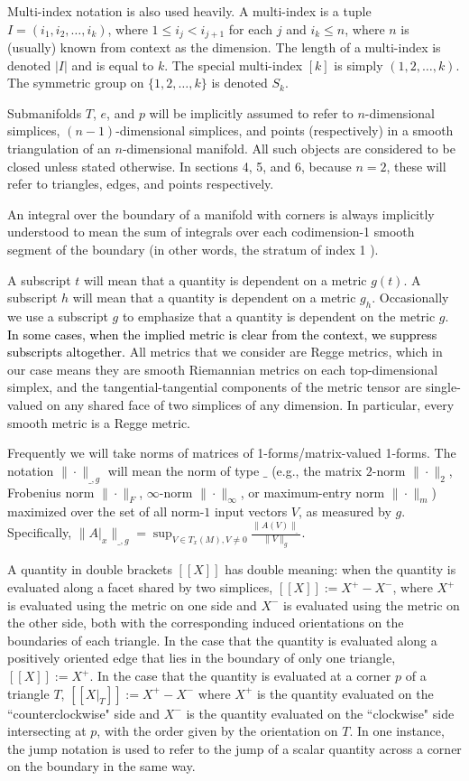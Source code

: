 \documentclass[11pt]{article}
\newcommand{\correction}[2]{\textcolor{red}{}\textcolor{black}{#2}}
\begin{document}
Multi-index notation is also used heavily. A multi-index is a tuple $I = (i_1,i_2,\dots,i_k)$, where $1 \le i_j < i_{j+1}$ for each $j$ and $i_k \le n$, where $n$ is (usually) known from context as the dimension. The length of a multi-index is denoted $|I|$ and is equal to $k$. The special multi-index $[k]$ is simply $(1,2,\dots,k)$.  The symmetric group on $\{1,2,\dots,k\}$ is denoted $S_k$.

Submanifolds $T$, $e$, and $p$ will be implicitly assumed to refer to $n$-dimensional simplices, $(n-1)$-dimensional simplices, and points (respectively) in a smooth triangulation of an $n$-dimensional manifold. All such objects are considered to be closed unless stated otherwise. In sections 4, 5, and 6, because $n=2$, these will refer to triangles, edges, and points respectively.

An integral over the boundary of a manifold with corners is always implicitly understood to mean the sum of integrals over each codimension-1 smooth segment of the boundary (in other words, the stratum of index 1 \cite{Knapp}).

A subscript $t$ will mean that a quantity is dependent on a metric $g(t)$. A subscript $h$ will mean that a quantity is dependent on a metric $g_h$. Occasionally we use a subscript $g$ to emphasize that a quantity is dependent on the metric $g$. \correction{}{In some cases, when the implied metric is clear from the context, we suppress subscripts altogether.} All metrics that we consider are Regge metrics, which in our case means they are smooth Riemannian metrics on each top-dimensional simplex, and the tangential-tangential components of the metric tensor are single-valued on any shared face of two simplices of any dimension. In particular, every smooth metric is a Regge metric.

Frequently we will take norms of matrices of 1-forms/matrix-valued 1-forms. The notation $\|\cdot\|_{\_,g}$ will mean the norm of type $\_$ (e.g., the matrix $2$-norm $\|\cdot\|_2$, Frobenius norm $\| \cdot\|_F$, $\infty$-norm $\|\cdot\|_\infty$, or maximum-entry norm $\|\cdot\|_m$) maximized over the set of all norm-$1$ input vectors $V$, as measured by $g$. Specifically, $\|A|_x\|_{\_,g} = \sup_{V \in T_x(M), V \ne 0}\frac{\|A(V)\|_{\_}}{\|V\|_g}$.

A quantity in double brackets $[\![X]\!]$ has double meaning: when the quantity is evaluated along a facet shared by two simplices, $[\![X]\!] := X^+ - X^-$, where $X^+$ is evaluated using the metric on one side and $X^-$ is evaluated using the metric on the other side, both with the corresponding induced orientations on the boundaries of each triangle. In the case that the quantity is evaluated along a positively oriented edge that lies in the boundary of only one triangle, $[\![X]\!] := X^+$. In the case that the quantity is evaluated at a corner $p$ of a triangle $T$, $[\![X|_T]\!] := X^+ - X^-$ where $X^+$ is the quantity evaluated on the ``counterclockwise" side and $X^-$ is the quantity evaluated on the ``clockwise" side intersecting at $p$, with the order given by the  orientation on $T$. In one instance, the jump notation is used to refer to the jump of a scalar quantity across a corner on the boundary in the same way.
\end{document}
